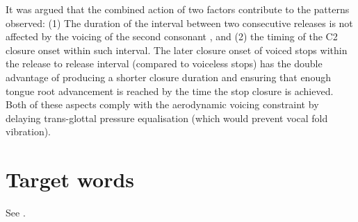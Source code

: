 \documentclass[12pt,]{article}
\begin{document}
It was argued that the combined action of two factors contribute to the
patterns observed: (1) The duration of the interval between two
consecutive releases is not affected by the voicing of the second
consonant \citep{coretta2018j}, and (2) the timing of the C2 closure
onset within such interval. The later closure onset of voiced stops
within the release to release interval (compared to voiceless stops) has
the double advantage of producing a shorter closure duration and
ensuring that enough tongue root advancement is reached by the time the
stop closure is achieved. Both of these aspects comply with the
aerodynamic voicing constraint \citep{ohala2011} by delaying
trans-glottal pressure equalisation (which would prevent vocal fold
vibration).

\appendix

\hypertarget{target-words}{%
\section{Target words}\label{target-words}}

\label{a:targets}

See .



\end{document}
